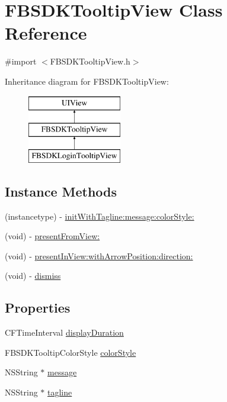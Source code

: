 \hypertarget{interface_f_b_s_d_k_tooltip_view}{}\section{F\+B\+S\+D\+K\+Tooltip\+View Class Reference}
\label{interface_f_b_s_d_k_tooltip_view}


{\ttfamily \#import $<$F\+B\+S\+D\+K\+Tooltip\+View.\+h$>$}

Inheritance diagram for F\+B\+S\+D\+K\+Tooltip\+View\+:\begin{figure}[H]
\begin{center}
\leavevmode
\includegraphics[height=3.000000cm]{interface_f_b_s_d_k_tooltip_view}
\end{center}
\end{figure}
\subsection*{Instance Methods}
\begin{DoxyCompactItemize}
\item 
(instancetype) -\/ \hyperlink{interface_f_b_s_d_k_tooltip_view_a43e09351fea51aba22ac6cf935d8e392}{init\+With\+Tagline\+:message\+:color\+Style\+:}
\item 
(void) -\/ \hyperlink{interface_f_b_s_d_k_tooltip_view_a32f5e16fb896d187676e116b9a5f4bc5}{present\+From\+View\+:}
\item 
(void) -\/ \hyperlink{interface_f_b_s_d_k_tooltip_view_ad815d7277fed56b3092ac704dd5c644c}{present\+In\+View\+:with\+Arrow\+Position\+:direction\+:}
\item 
(void) -\/ \hyperlink{interface_f_b_s_d_k_tooltip_view_ad4d16e66754fef6dcb08a3f1d29ebca6}{dismiss}
\end{DoxyCompactItemize}
\subsection*{Properties}
\begin{DoxyCompactItemize}
\item 
C\+F\+Time\+Interval \hyperlink{interface_f_b_s_d_k_tooltip_view_ac94d81890eb496c7afc56277586f938f}{display\+Duration}
\item 
F\+B\+S\+D\+K\+Tooltip\+Color\+Style \hyperlink{interface_f_b_s_d_k_tooltip_view_a0c9571339fcc84d808716d3911d504fc}{color\+Style}
\item 
N\+S\+String $\ast$ \hyperlink{interface_f_b_s_d_k_tooltip_view_af6b9bdb1ec818c555c7cde749f22d62c}{message}
\item 
N\+S\+String $\ast$ \hyperlink{interface_f_b_s_d_k_tooltip_view_a48a5512acd97a1af6fbf64e2689e21e2}{tagline}
\end{DoxyCompactItemize}


